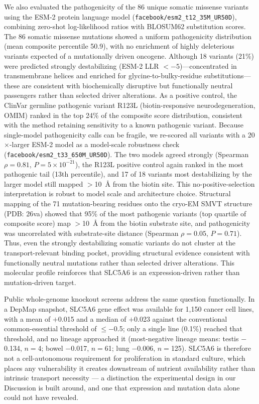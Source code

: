 \documentclass[pdflatex,sn-nature]{sn-jnl}
\begin{document}
We also evaluated the pathogenicity of the 86 unique somatic missense variants using the ESM-2 protein language model (\nolinkurl{facebook/esm2_t12_35M_UR50D}), combining zero-shot log-likelihood ratios with BLOSUM62 substitution scores. The 86 somatic missense mutations showed a uniform pathogenicity distribution (mean composite percentile 50.9), with no enrichment of highly deleterious variants expected of a mutationally driven oncogene. Although 18 variants (21\%) were predicted strongly destabilizing (ESM-2 LLR $<-5$)---concentrated in transmembrane helices and enriched for glycine-to-bulky-residue substitutions---these are consistent with biochemically disruptive but functionally neutral passengers rather than selected driver alterations. As a positive control, the ClinVar germline pathogenic variant R123L (biotin-responsive neurodegeneration, OMIM) ranked in the top 24\% of the composite score distribution, consistent with the method retaining sensitivity to a known pathogenic variant. Because single-model pathogenicity calls can be fragile, we re-scored all variants with a 20$\times$-larger ESM-2 model as a model-scale robustness check (\nolinkurl{facebook/esm2_t33_650M_UR50D}). The two models agreed strongly (Spearman $\rho=0.81$, $P=5\times10^{-21}$), the R123L positive control again ranked in the most pathogenic tail (13th percentile), and 17 of 18 variants most destabilizing by the larger model still mapped $>$10~\AA{} from the biotin site. This no-positive-selection interpretation is robust to model scale and architecture choice. Structural mapping of the 71 mutation-bearing residues onto the cryo-EM SMVT structure (PDB: 26va) showed that 95\% of the most pathogenic variants (top quartile of composite score) map $>$10~\AA{} from the biotin substrate site, and pathogenicity was uncorrelated with substrate-site distance (Spearman $\rho=0.05$, $P=0.71$). Thus, even the strongly destabilizing somatic variants do not cluster at the transport-relevant binding pocket, providing structural evidence consistent with functionally neutral mutations rather than selected driver alterations. This molecular profile reinforces that SLC5A6 is an expression-driven rather than mutation-driven target.

Public whole-genome knockout screens address the same question functionally. In a DepMap snapshot, SLC5A6 gene effect was available for 1,150 cancer cell lines, with a mean of $+$0.015 and a median of $+$0.023 against the conventional common-essential threshold of $\le$$-$0.5; only a single line (0.1\%) reached that threshold, and no lineage approached it (most-negative lineage means: testis $-$0.134, $n=$4; bowel $-$0.017, $n=$61; lung $-$0.006, $n=$125). SLC5A6 is therefore not a cell-autonomous requirement for proliferation in standard culture, which places any vulnerability it creates downstream of nutrient availability rather than intrinsic transport necessity --- a distinction the experimental design in our Discussion is built around, and one that expression and mutation data alone could not have revealed.
\end{document}
